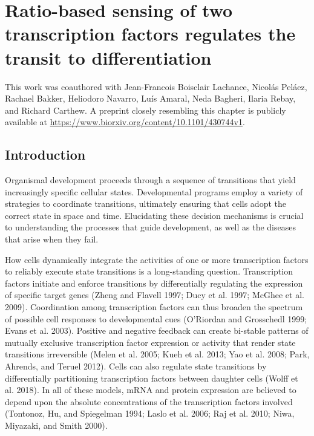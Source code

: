 \graphicspath{ {./figures/ch2/} }


\chapter{Ratio-based sensing of two transcription factors regulates the transit to differentiation}
\label{ch2:ratio}

This work was coauthored with Jean-Francois Boisclair Lachance, Nicol\'{a}s Pel\'{a}ez, Rachael Bakker, Heliodoro Navarro, Lu\'{i}s Amaral, Neda Bagheri, Ilaria Rebay, and Richard Carthew. A preprint closely resembling this chapter is publicly available at \url{https://www.biorxiv.org/content/10.1101/430744v1}.

\section{Introduction}

Organismal development proceeds through a sequence of transitions that yield increasingly specific cellular states. Developmental programs employ a variety of strategies to coordinate transitions, ultimately ensuring that cells adopt the correct state in space and time. Elucidating these decision mechanisms is crucial to understanding the processes that guide development, as well as the diseases that arise when they fail.

How cells dynamically integrate the activities of one or more transcription factors to reliably execute state transitions is a long-standing question. Transcription factors initiate and enforce transitions by differentially regulating the expression of specific target genes (Zheng and Flavell 1997; Ducy et al. 1997; McGhee et al. 2009). Coordination among transcription factors can thus broaden the spectrum of possible cell responses to developmental cues (O'Riordan and Grosschedl 1999; Evans et al. 2003). Positive and negative feedback can create bi-stable patterns of mutually exclusive transcription factor expression or activity that render state transitions irreversible (Melen et al. 2005; Kueh et al. 2013; Yao et al. 2008; Park, Ahrends, and Teruel 2012). Cells can also regulate state transitions by differentially partitioning transcription factors between daughter cells (Wolff et al. 2018). In all of these models, mRNA and protein expression are believed to depend upon the absolute concentrations of the transcription factors involved (Tontonoz, Hu, and Spiegelman 1994; Laslo et al. 2006; Raj et al. 2010; Niwa, Miyazaki, and Smith 2000).

